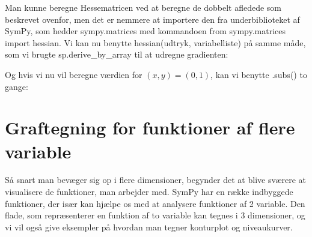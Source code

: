\documentclass[letterpaper,10pt,english]{jupyterBook}
\begin{document}
Man kunne beregne Hessematricen ved at beregne de dobbelt afledede som beskrevet ovenfor, men det er nemmere at importere den fra underbiblioteket af SymPy, som hedder sympy.matrices med kommandoen from sympy.matrices import hessian. Vi kan nu benytte hessian(udtryk, variabelliste) på samme måde, som vi brugte sp.derive\_by\_array til at udregne gradienten:

\begin{sphinxVerbatim}[commandchars=\\\{\}]
           
                   

   \PYG{p}{[} \PYG{p}{]}
\end{sphinxVerbatim}

\noindent{}

Og hvis vi nu vil beregne værdien for \((x, y) = (0, 1)\), kan vi benytte .subs() to gange:

\begin{sphinxVerbatim}[commandchars=\\\{\}]
  
\end{sphinxVerbatim}

\noindent{}


\section{Graftegning for funktioner af flere variable}
\label{\detokenize{notebooks/sympy/Notebook_FlereVar_analyse:graftegning-for-funktioner-af-flere-variable}}
Så snart man bevæger sig op i flere dimensioner, begynder det at blive sværere at visualisere de funktioner, man arbejder med. SymPy har en række indbyggede funktioner, der især kan hjælpe os med at analysere funktioner af 2 variable. Den flade, som repræsenterer en funktion af to variable kan tegnes i 3 dimensioner, og vi vil også give eksempler på hvordan man tegner konturplot og niveaukurver.
\end{document}
